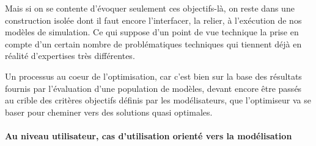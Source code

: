 Mais si on se contente d'évoquer seulement ces objectifs-là, on reste dans une construction isolée dont il faut encore l'interfacer, la relier, à l'exécution de nos modèles de simulation. Ce qui suppose d'un point de vue technique la prise en compte d'un certain nombre de problématiques techniques qui tiennent déjà en réalité d'expertises très différentes.

Un processus au coeur de l'optimisation, car c'est bien sur la base des résultats fournis par l'évaluation d'une population de modèles, devant encore être passés au crible des critères objectifs définis par les modélisateurs, que l'optimiseur va se baser pour cheminer vers des solutions quasi optimales.

\paragraph{Au niveau utilisateur, cas d'utilisation orienté vers la modélisation }

